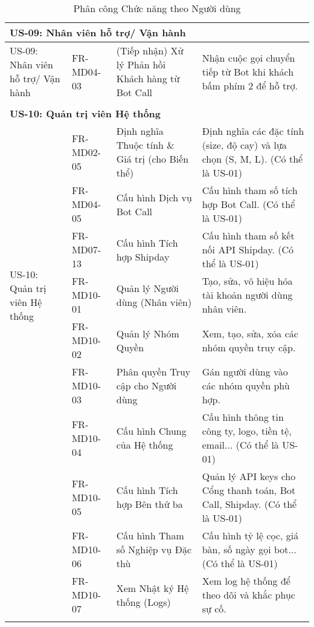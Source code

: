 \begin{longtable}{|m{2.5cm}|m{2.5cm}|m{5cm}|m{5cm}|}
\multicolumn{4}{|l|}{\textbf{US-09: Nhân viên hỗ trợ/ Vận hành}} \\ \hline
\multirow{1}{=}[2pt]{US-09: Nhân viên hỗ trợ/ Vận hành} & FR-MD04-03 & (Tiếp nhận) Xử lý Phản hồi Khách hàng từ Bot Call & Nhận cuộc gọi chuyển tiếp từ Bot khi khách bấm phím 2 để hỗ trợ. \\
&&&
\tabularnewline\hline
\multicolumn{4}{|l|}{\textbf{US-10: Quản trị viên Hệ thống}} \\ \hline
\multirow{7}{=}[2pt]{US-10: Quản trị viên Hệ thống} & FR-MD02-05 & Định nghĩa Thuộc tính \& Giá trị (cho Biến thể) & Định nghĩa các đặc tính (size, độ cay) và lựa chọn (S, M, L). (Có thể là US-01) \\ \cline{2-4}
& FR-MD04-05 & Cấu hình Dịch vụ Bot Call & Cấu hình tham số tích hợp Bot Call. (Có thể là US-01) \\ \cline{2-4}
& FR-MD07-13 & Cấu hình Tích hợp Shipday & Cấu hình tham số kết nối API Shipday. (Có thể là US-01) \\ \cline{2-4}
& FR-MD10-01 & Quản lý Người dùng (Nhân viên) & Tạo, sửa, vô hiệu hóa tài khoản người dùng nhân viên. \\
& FR-MD10-02 & Quản lý Nhóm Quyền & Xem, tạo, sửa, xóa các nhóm quyền truy cập. \\
& FR-MD10-03 & Phân quyền Truy cập cho Người dùng & Gán người dùng vào các nhóm quyền phù hợp. \\
& FR-MD10-04 & Cấu hình Chung của Hệ thống & Cấu hình thông tin công ty, logo, tiền tệ, email... (Có thể là US-01) \\
& FR-MD10-05 & Cấu hình Tích hợp Bên thứ ba & Quản lý API keys cho Cổng thanh toán, Bot Call, Shipday. (Có thể là US-01) \\
& FR-MD10-06 & Cấu hình Tham số Nghiệp vụ Đặc thù & Cấu hình tỷ lệ cọc, giá bàn, số ngày gọi bot... (Có thể là US-01) \\
& FR-MD10-07 & Xem Nhật ký Hệ thống (Logs) & Xem log hệ thống để theo dõi và khắc phục sự cố. \\
\hline
\caption{Phân công Chức năng theo Người dùng} \label{tab:user_function_map} \\

\end{longtable}

\newpage


